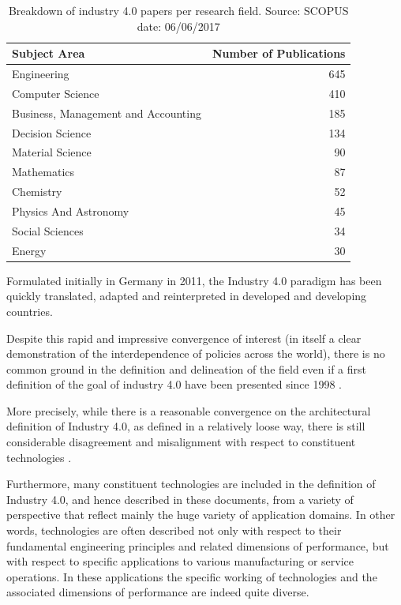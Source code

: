 \documentclass[b5paper,]{book}
\theoremstyle{definition}
\theoremstyle{definition}
\theoremstyle{definition}
\theoremstyle{remark}
\begin{document}
\begin{table}

\caption{\label{tab:tabletech40scopus}Breakdown of industry 4.0 papers per research field. Source: SCOPUS date: 06/06/2017}
\centering
\begin{tabular}[t]{lr}
\toprule
Subject Area & Number of Publications\\
\midrule
Engineering & 645\\
Computer Science & 410\\
Business, Management and Accounting & 185\\
Decision Science & 134\\
Material Science & 90\\
\addlinespace
Mathematics & 87\\
Chemistry & 52\\
Physics And Astronomy & 45\\
Social Sciences & 34\\
Energy & 30\\
\bottomrule
\end{tabular}
\end{table}

Formulated initially in Germany in 2011, the Industry 4.0 paradigm has
been quickly translated, adapted and reinterpreted in developed and
developing countries.

Despite this rapid and impressive convergence of interest (in itself a
clear demonstration of the interdependence of policies across the
world), there is no common ground in the definition and delineation of
the field even if a first definition of the goal of industry 4.0 have
been presented since 1998 \citep{national1998visionary}.

More precisely, while there is a reasonable convergence on the
architectural definition of Industry 4.0, as defined in a relatively
loose way, there is still considerable disagreement and misalignment
with respect to constituent technologies
\citep{riel2017integrated, smit2016industry, o2015industrial}.

Furthermore, many constituent technologies are included in the
definition of Industry 4.0, and hence described in these documents, from
a variety of perspective that reflect mainly the huge variety of
application domains. In other words, technologies are often described
not only with respect to their fundamental engineering principles and
related dimensions of performance, but with respect to specific
applications to various manufacturing or service operations. In these
applications the specific working of technologies and the associated
dimensions of performance are indeed quite diverse.
\end{document}
